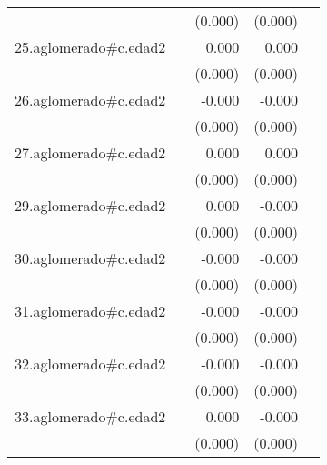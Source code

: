 {\begin{longtable}{l*{4}{D{.}{.}{-1}}}
            &                     &     (0.000)         &     (0.000)         &                     \\
\addlinespace
25.aglomerado#c.edad2&                     &       0.000         &       0.000         &                     \\
            &                     &     (0.000)         &     (0.000)         &                     \\
\addlinespace
26.aglomerado#c.edad2&                     &      -0.000         &      -0.000         &                     \\
            &                     &     (0.000)         &     (0.000)         &                     \\
\addlinespace
27.aglomerado#c.edad2&                     &       0.000         &       0.000         &                     \\
            &                     &     (0.000)         &     (0.000)         &                     \\
\addlinespace
29.aglomerado#c.edad2&                     &       0.000         &      -0.000         &                     \\
            &                     &     (0.000)         &     (0.000)         &                     \\
\addlinespace
30.aglomerado#c.edad2&                     &      -0.000         &      -0.000\sym{*}  &                     \\
            &                     &     (0.000)         &     (0.000)         &                     \\
\addlinespace
31.aglomerado#c.edad2&                     &      -0.000         &      -0.000\sym{***}&                     \\
            &                     &     (0.000)         &     (0.000)         &                     \\
\addlinespace
32.aglomerado#c.edad2&                     &      -0.000         &      -0.000\sym{***}&                     \\
            &                     &     (0.000)         &     (0.000)         &                     \\
\addlinespace
33.aglomerado#c.edad2&                     &       0.000         &      -0.000\sym{**} &                     \\
            &                     &     (0.000)         &     (0.000)         &                     \\

\end{longtable}}
